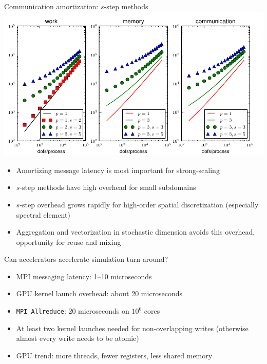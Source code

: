 \documentclass[final,t]{beamer}
\begin{document}
\begin{frame}{}
\begin{columns}
\begin{column}{0.31\textwidth}
      \begin{block}{Communication amortization: $s$-step methods}
        \includegraphics[width=1\textwidth]{figures/SStepEfficiencyP3.pdf}
        \begin{itemize}
        \item Amortizing message latency is most important for strong-scaling
        \item $s$-step methods have high overhead for small subdomains
        \item $s$-step overhead grows rapidly for high-order spatial discretization (especially spectral element)
        \item Aggregation and vectorization in stochastic dimension avoids this overhead, opportunity for reuse and mixing
        \end{itemize}
      \end{block}
      \vspace{-2em}
      \begin{block}{Can accelerators accelerate simulation turn-around?}
        \begin{itemize}
        \item MPI messaging latency: 1--10 microseconds
        \item GPU kernel launch overhead: about 20 microseconds
        \item \texttt{MPI\_Allreduce}: 20 microseconds on $10^6$ cores
        \item At least two kernel launches needed for non-overlapping writes (otherwise almost every write needs to be atomic)
        \item GPU trend: more threads, fewer registers, less shared memory
        \end{itemize}
      \end{block}


\end{column}
\end{columns}
\end{frame}
\end{document}

